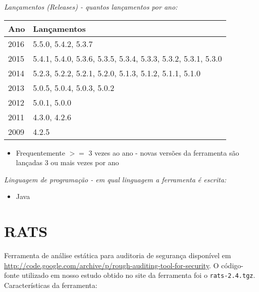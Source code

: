 \begin{description}

  \item {\it Lançamentos ({\it Releases}) - quantos lançamentos por ano:}
    \begin{table}[h!]
      \centering
      \begin{tabular}{| l | l |}
        \hline
        Ano  & Lançamentos                                                   \\
        \hline
        2016 & 5.5.0, 5.4.2, 5.3.7                                           \\
        2015 & 5.4.1, 5.4.0, 5.3.6, 5.3.5, 5.3.4, 5.3.3, 5.3.2, 5.3.1, 5.3.0 \\
        2014 & 5.2.3, 5.2.2, 5.2.1, 5.2.0, 5.1.3, 5.1.2, 5.1.1, 5.1.0        \\
        2013 & 5.0.5, 5.0.4, 5.0.3, 5.0.2                                    \\
        2012 & 5.0.1, 5.0.0                                                  \\
        2011 & 4.3.0, 4.2.6                                                  \\
        2009 & 4.2.5                                                         \\
        \hline
      \end{tabular}
    \end{table}
    \begin{itemize}
      \item Frequentemente $>=$ 3 vezes ao ano - novas versões da ferramenta são lançadas 3 ou mais vezes por ano
    \end{itemize}

  \item {\it Linguagem de programação - em qual linguagem a ferramenta é escrita:}
    \begin{itemize}
      \item Java
    \end{itemize}

\end{description}

\section{RATS}

Ferramenta de análise estática para auditoria de segurança disponível em
\url{http://code.google.com/archive/p/rough-auditing-tool-for-security}. O
código-fonte utilizado em nosso estudo obtido no site da ferramenta foi o
\texttt{rats-2.4.tgz}. Características da ferramenta:

